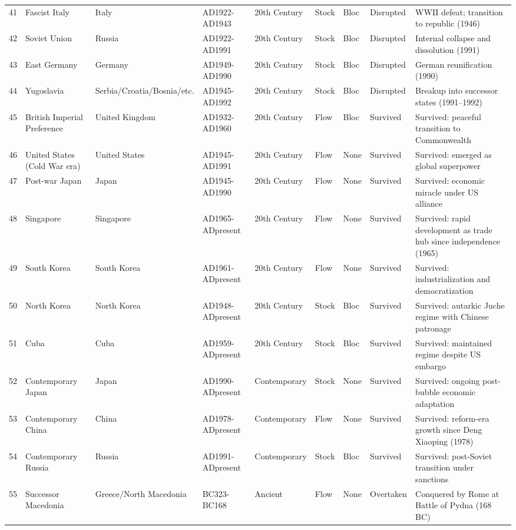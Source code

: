 \documentclass[11pt]{article}
\begin{document}
\begin{longtable}{@{}r l l l l l l l p{5.5cm}@{}}
41 & Fascist Italy & Italy & AD1922-AD1943 & 20th Century & Stock & Bloc & Disrupted & WWII defeat; transition to republic (1946) \\
42 & Soviet Union & Russia & AD1922-AD1991 & 20th Century & Stock & Bloc & Disrupted & Internal collapse and dissolution (1991) \\
43 & East Germany & Germany & AD1949-AD1990 & 20th Century & Stock & Bloc & Disrupted & German reunification (1990) \\
44 & Yugoslavia & Serbia/Croatia/Bosnia/etc. & AD1945-AD1992 & 20th Century & Stock & Bloc & Disrupted & Breakup into successor states (1991--1992) \\
45 & British Imperial Preference & United Kingdom & AD1932-AD1960 & 20th Century & Flow & Bloc & Survived & Survived: peaceful transition to Commonwealth \\
46 & United States (Cold War era) & United States & AD1945-AD1991 & 20th Century & Flow & None & Survived & Survived: emerged as global superpower \\
47 & Post-war Japan & Japan & AD1945-AD1990 & 20th Century & Flow & None & Survived & Survived: economic miracle under US alliance \\
48 & Singapore & Singapore & AD1965-ADpresent & 20th Century & Flow & None & Survived & Survived: rapid development as trade hub since independence (1965) \\
49 & South Korea & South Korea & AD1961-ADpresent & 20th Century & Flow & None & Survived & Survived: industrialization and democratization \\
50 & North Korea & North Korea & AD1948-ADpresent & 20th Century & Stock & Bloc & Survived & Survived: autarkic Juche regime with Chinese patronage \\
51 & Cuba & Cuba & AD1959-ADpresent & 20th Century & Stock & Bloc & Survived & Survived: maintained regime despite US embargo \\
52 & Contemporary Japan & Japan & AD1990-ADpresent & Contemporary & Stock & None & Survived & Survived: ongoing post-bubble economic adaptation \\
53 & Contemporary China & China & AD1978-ADpresent & Contemporary & Flow & None & Survived & Survived: reform-era growth since Deng Xiaoping (1978) \\
54 & Contemporary Russia & Russia & AD1991-ADpresent & Contemporary & Stock & Bloc & Survived & Survived: post-Soviet transition under sanctions \\
55 & Successor Macedonia & Greece/North Macedonia & BC323-BC168 & Ancient & Flow & None & Overtaken & Conquered by Rome at Battle of Pydna (168 BC) \\

\end{longtable}
\end{document}
